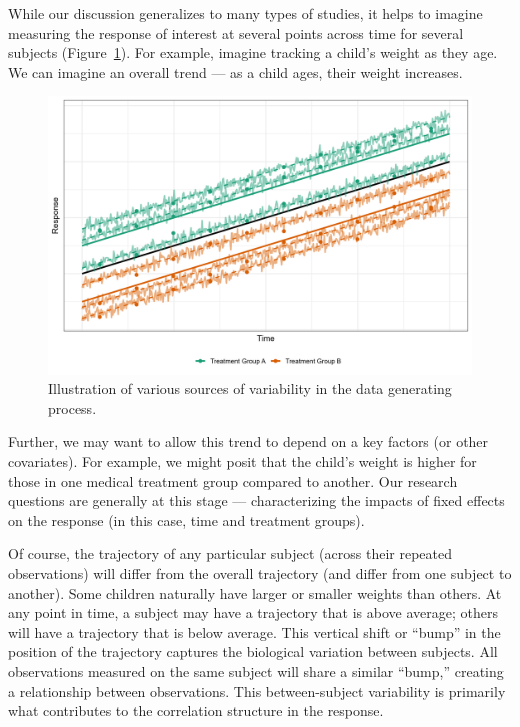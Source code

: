 \documentclass[
  letterpaper,
  DIV=11,
  numbers=noendperiod]{scrreprt}
\theoremstyle{definition}
\theoremstyle{definition}
\theoremstyle{remark}
\begin{document}
While our discussion generalizes to many types of studies, it helps to
imagine measuring the response of interest at several points across time
for several subjects (Figure~\ref{fig-rm-mixed-models-variability}). For
example, imagine tracking a child's weight as they age. We can imagine
an overall trend --- as a child ages, their weight increases.

\begin{figure}

{\centering \includegraphics{./images/gifvarplotalt.jpg}

}

\caption{\label{fig-rm-mixed-models-variability}Illustration of various
sources of variability in the data generating process.}

\end{figure}

Further, we may want to allow this trend to depend on a key factors (or
other covariates). For example, we might posit that the child's weight
is higher for those in one medical treatment group compared to another.
Our research questions are generally at this stage --- characterizing
the impacts of fixed effects on the response (in this case, time and
treatment groups).

Of course, the trajectory of any particular subject (across their
repeated observations) will differ from the overall trajectory (and
differ from one subject to another). Some children naturally have larger
or smaller weights than others. At any point in time, a subject may have
a trajectory that is above average; others will have a trajectory that
is below average. This vertical shift or ``bump'' in the position of the
trajectory captures the biological variation between subjects. All
observations measured on the same subject will share a similar ``bump,''
creating a relationship between observations. This between-subject
variability is primarily what contributes to the correlation structure
in the response.
\end{document}
